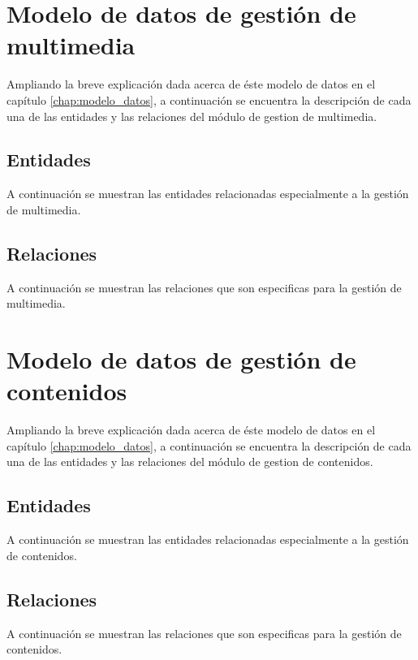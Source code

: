 \section{Modelo de datos de gestión de multimedia}
Ampliando la breve explicación dada acerca de éste modelo de datos en el capítulo \ref{chap:modelo_datos}, a continuación se encuentra la descripción de cada una de las entidades y las relaciones del módulo de gestion de multimedia.
\subsection{Entidades}
A continuación se muestran las entidades relacionadas especialmente a la gestión de multimedia.





\subsection{Relaciones}
A continuación se muestran las relaciones que son especificas para la gestión de multimedia.






\section{Modelo de datos de gestión de contenidos}
Ampliando la breve explicación dada acerca de éste modelo de datos en el capítulo \ref{chap:modelo_datos}, a continuación se encuentra la descripción de cada una de las entidades y las relaciones del módulo de gestion de contenidos.
\subsection{Entidades}
A continuación se muestran las entidades relacionadas especialmente a la gestión de contenidos.

\subsection{Relaciones}
A continuación se muestran las relaciones que son especificas para la gestión de contenidos.


